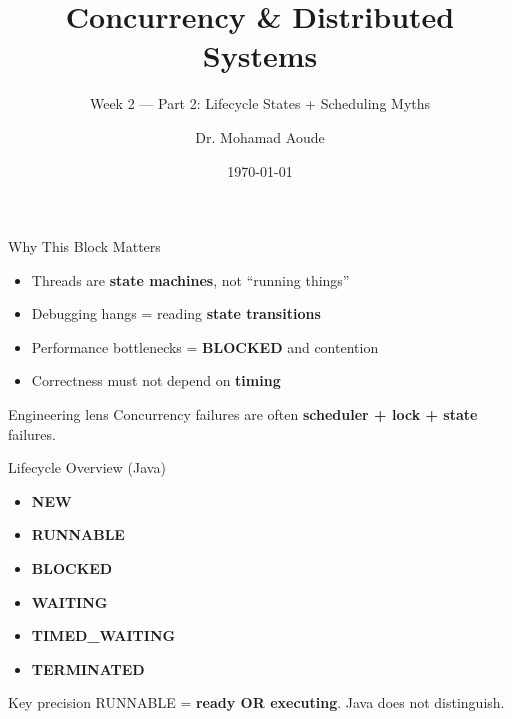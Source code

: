 \documentclass[aspectratio=169,11pt]{beamer}
\title{Concurrency \& Distributed Systems}
\subtitle{Week 2 --- Part 2: Lifecycle States + Scheduling Myths}
\author{Dr. Mohamad Aoude}
\institute{Lebanese University \\ Faculty of Engineering}
\date{\today}
\begin{document}
	
	\begin{frame}
		\titlepage
	\end{frame}
	
	\begin{frame}{Why This Block Matters}
		\begin{itemize}
			\item Threads are \textbf{state machines}, not “running things”
			\item Debugging hangs = reading \textbf{state transitions}
			\item Performance bottlenecks = \textbf{BLOCKED} and contention
			\item Correctness must not depend on \textbf{timing}
		\end{itemize}
		
		\vspace{4mm}
		\begin{block}{Engineering lens}
			Concurrency failures are often \textbf{scheduler + lock + state} failures.
		\end{block}
	\end{frame}
	
	\begin{frame}{Lifecycle Overview (Java)}
		\begin{itemize}
			\item \textbf{NEW}
			\item \textbf{RUNNABLE}
			\item \textbf{BLOCKED}
			\item \textbf{WAITING}
			\item \textbf{TIMED\_WAITING}
			\item \textbf{TERMINATED}
		\end{itemize}
		
		\vspace{4mm}
		\begin{block}{Key precision}
			RUNNABLE = \textbf{ready OR executing}. Java does not distinguish.
		\end{block}
	\end{frame}
	
\end{document}
